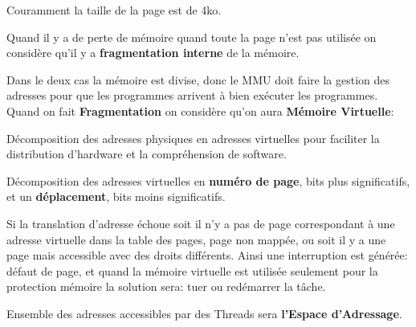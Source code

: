 \documentclass{article}
\begin{document}
\begin{enumerate}[rightmargin=\leftmargin]
\begin{definition}
\begin{figure}[H]
        \end{figure}
    
        \begin{remark}
            Couramment la taille de la page est de 4ko.
        \end{remark}
        Quand il y a de perte de mémoire quand toute la page n'est pas utilisée on considère qu'il y a \textbf{fragmentation interne} de la mémoire.
    \end{definition}
\end{enumerate}
Dans le deux cas la mémoire est divise, donc le MMU doit faire la gestion des adresses pour que les programmes arrivent à bien exécuter les programmes. Quand on fait \textbf{Fragmentation} on considère qu'on aura \textbf{Mémoire Virtuelle}:
\begin{definition}
    Décomposition des adresses physiques en adresses virtuelles pour faciliter la distribution d'hardware et la compréhension de software.

    \begin{remark}
        Décomposition des adresses virtuelles en \textbf{numéro de page}, bits plus significatifs, et un \textbf{déplacement}, bits moins significatifs.
    \end{remark}
\end{definition}
Si la translation d'adresse échoue soit il n'y a pas de page correspondant à une adresse virtuelle dans la table des pages, page non mappée, ou soit il y a une page mais accessible avec des droits différents. Ainsi une interruption est générée: défaut de page, et quand la mémoire virtuelle est utilisée seulement pour la protection mémoire la solution sera: tuer ou redémarrer la tâche.
\begin{definition}
    Ensemble des adresses accessibles par des Threads sera \textbf{l'Espace d'Adressage}.
\end{definition}
\end{document}
